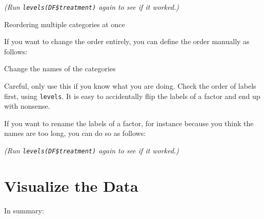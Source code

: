\documentclass[
]{book}
\newenvironment{Shaded}{\begin{snugshade}}{\end{snugshade}}
\newcommand{\AttributeTok}[1]{\textcolor[rgb]{0.77,0.63,0.00}{#1}}
\newcommand{\CommentTok}[1]{\textcolor[rgb]{0.56,0.35,0.01}{\textit{#1}}}
\newcommand{\FunctionTok}[1]{\textcolor[rgb]{0.00,0.00,0.00}{#1}}
\newcommand{\NormalTok}[1]{#1}
\newcommand{\OtherTok}[1]{\textcolor[rgb]{0.56,0.35,0.01}{#1}}
\newcommand{\SpecialCharTok}[1]{\textcolor[rgb]{0.00,0.00,0.00}{#1}}
\newcommand{\StringTok}[1]{\textcolor[rgb]{0.31,0.60,0.02}{#1}}
\begin{document}
\emph{(Run \texttt{levels(DF\$treatment)} again to see if it worked.)}

Reordering multiple categories at once

If you want to change the order entirely, you can define the order manually as follows:

\begin{Shaded}
\end{Shaded}

Change the names of the categories

Careful, only use this if you know what you are doing. Check the order of labels first, using \texttt{levels}. It is easy to accidentally flip the labels of a factor and end up with nonsense.

If you want to rename the labels of a factor, for instance because you think the names are too long, you can do so as follows:

\begin{Shaded}
\end{Shaded}

\emph{(Run \texttt{levels(DF\$treatment)} again to see if it worked.)}

\hypertarget{vis-ANOVA}{%
\section{Visualize the Data}\label{vis-ANOVA}}

In summary:
\end{document}
